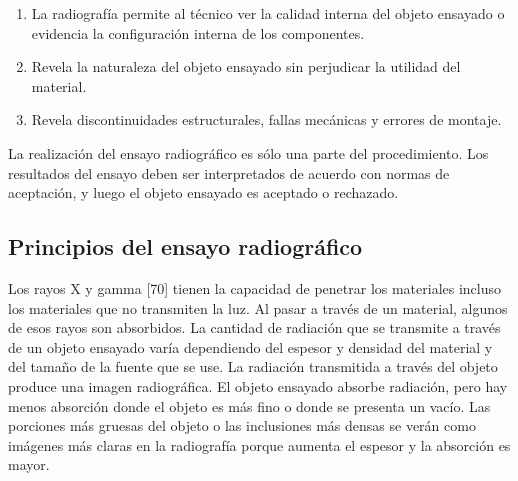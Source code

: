 \begin{enumerate}
\item La radiografía permite al técnico ver la calidad interna del objeto ensayado o evidencia la
configuración interna de los componentes.
\item Revela la naturaleza del objeto ensayado sin perjudicar la utilidad del material.
\item Revela discontinuidades estructurales, fallas mecánicas y errores de montaje.
\end{enumerate}

La realización del ensayo radiográfico es sólo una parte del procedimiento. Los resultados del ensayo deben ser interpretados de acuerdo con normas de aceptación, y luego el objeto ensayado es aceptado o rechazado.

\subsection{Principios del ensayo radiográfico}
Los rayos X y gamma [70] tienen la capacidad de penetrar los materiales incluso los materiales que no transmiten la luz. Al pasar a través de un material, algunos de esos rayos son absorbidos. La cantidad de radiación que se transmite a través de un objeto ensayado varía dependiendo del espesor y densidad del material y del tamaño de la fuente que se use. La radiación transmitida a través del objeto produce una imagen radiográfica. El objeto ensayado absorbe radiación, pero hay menos absorción donde el objeto es más fino o donde se presenta un vacío. Las porciones más gruesas del objeto o las inclusiones más densas se verán como imágenes más claras en la radiografía porque aumenta el espesor y la absorción es mayor.